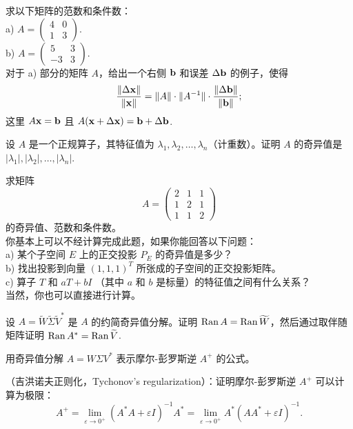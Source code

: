 \begin{problemset}
\item \label{ex:06-04-01} 求以下矩阵的范数和条件数：
\\
a) $A = \begin{pmatrix} 4 & 0 \\ 1 & 3 \end{pmatrix}$.~
    \\
b) $A = \begin{pmatrix} 5 & 3 \\ -3 & 3 \end{pmatrix}$.~
\\
对于 a) 部分的矩阵 $A$，给出一个右侧 $\mathbf{b}$ 和误差 $\Delta \mathbf{b}$ 的例子，使得
$$\frac{\|\Delta \mathbf{x}\|} {\|\mathbf{x}\| }= \|A\| \cdot \|A^{-1}\| \cdot \frac{\|\Delta \mathbf{b}\| }{\|\mathbf{b}\|};$$
这里 $A\mathbf{x} = \mathbf{b}$ 且 $A(\mathbf{x} + \Delta \mathbf{x}) = \mathbf{b} + \Delta \mathbf{b}$.~
\item \label{ex:06-04-02} 设 $A$ 是一个正规算子，其特征值为 $\lambda_1, \lambda_2, \dots, \lambda_n$（计重数）。证明 $A$ 的奇异值是 $|\lambda_1|, |\lambda_2|, \dots, |\lambda_n|$.~
\item \label{ex:06-04-03} 求矩阵 $$A = \begin{pmatrix} 2 & 1 & 1 \\ 1 & 2 & 1 \\ 1 & 1 & 2 \end{pmatrix}$$ 的奇异值、范数和条件数。\\
你基本上可以不经计算完成此题，如果你能回答以下问题：
\\
a) 某个子空间 $E$ 上的正交投影 $P_E$ 的奇异值是多少？
    \\
b) 找出投影到向量 $(1, 1, 1)^T$ 所张成的子空间的正交投影矩阵。
\\
c) 算子 $T$ 和 $aT + bI$ （其中 $a$ 和 $b$ 是标量）的特征值之间有什么关系？
\\
当然，你也可以直接进行计算。
\item \label{ex:06-04-04} 设 $A = \widetilde{W} \widetilde{\Sigma} \widetilde{V}^*$ 是 $A$ 的约简奇异值分解。证明 $\operatorname{Ran} A = \operatorname{Ran} \widetilde{W}$，然后通过取伴随矩阵证明 $\operatorname{Ran} A^* = \operatorname{Ran} \widetilde{V}$.~
\item \label{ex:06-04-05} 用奇异值分解 $A = W \Sigma V^*$ 表示摩尔-彭罗斯逆 $A^+$ 的公式。
\item \label{ex:06-04-06} （吉洪诺夫正则化，Tychonov’s regularization）：证明摩尔-彭罗斯逆 $A^+$ 可以计算为极限：
$$A^+ = \lim_{\varepsilon \to 0^+} (A^*A + \varepsilon I)^{-1} A^* = \lim_{\varepsilon \to 0^+} A^*(AA^* + \varepsilon I)^{-1}.$$
\end{problemset}

